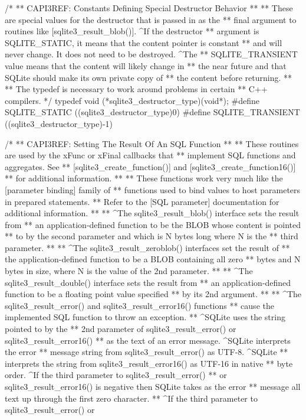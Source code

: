 \begin{Codex}[label=sqlite3.h,numbers=left]
{/*
** CAPI3REF: Constants Defining Special Destructor Behavior
**
** These are special values for the destructor that is passed in as the
** final argument to routines like [sqlite3_result_blob()].  ^If the destructor
** argument is SQLITE_STATIC, it means that the content pointer is constant
** and will never change.  It does not need to be destroyed.  ^The
** SQLITE_TRANSIENT value means that the content will likely change in
** the near future and that SQLite should make its own private copy of
** the content before returning.
**
** The typedef is necessary to work around problems in certain
** C++ compilers.
*/
typedef void (*sqlite3_destructor_type)(void*);
#define SQLITE_STATIC      ((sqlite3_destructor_type)0)
#define SQLITE_TRANSIENT   ((sqlite3_destructor_type)-1)

/*
** CAPI3REF: Setting The Result Of An SQL Function
**
** These routines are used by the xFunc or xFinal callbacks that
** implement SQL functions and aggregates.  See
** [sqlite3_create_function()] and [sqlite3_create_function16()]
** for additional information.
**
** These functions work very much like the [parameter binding] family of
** functions used to bind values to host parameters in prepared statements.
** Refer to the [SQL parameter] documentation for additional information.
**
** ^The sqlite3_result_blob() interface sets the result from
** an application-defined function to be the BLOB whose content is pointed
** to by the second parameter and which is N bytes long where N is the
** third parameter.
**
** ^The sqlite3_result_zeroblob() interfaces set the result of
** the application-defined function to be a BLOB containing all zero
** bytes and N bytes in size, where N is the value of the 2nd parameter.
**
** ^The sqlite3_result_double() interface sets the result from
** an application-defined function to be a floating point value specified
** by its 2nd argument.
**
** ^The sqlite3_result_error() and sqlite3_result_error16() functions
** cause the implemented SQL function to throw an exception.
** ^SQLite uses the string pointed to by the
** 2nd parameter of sqlite3_result_error() or sqlite3_result_error16()
** as the text of an error message.  ^SQLite interprets the error
** message string from sqlite3_result_error() as UTF-8. ^SQLite
** interprets the string from sqlite3_result_error16() as UTF-16 in native
** byte order.  ^If the third parameter to sqlite3_result_error()
** or sqlite3_result_error16() is negative then SQLite takes as the error
** message all text up through the first zero character.
** ^If the third parameter to sqlite3_result_error() or
}
\end{Codex}
